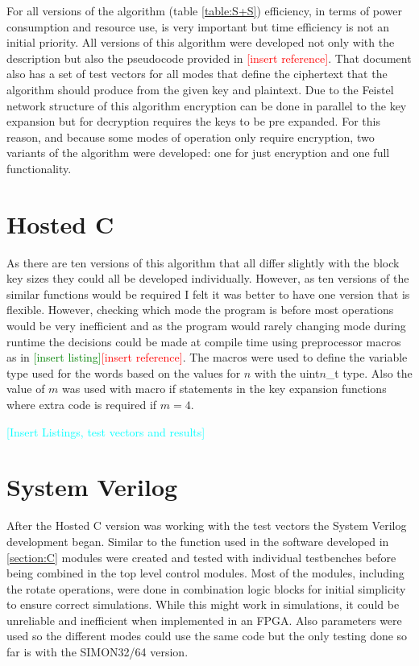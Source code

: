 \documentclass[12pt,twoside,a4paper]{report}
\begin{document}
    For all versions of the algorithm (table \ref{table:S+S}) efficiency, in terms of power consumption and resource use, is very important but time efficiency is not an initial priority. All versions of this algorithm were developed not only with the description but also the pseudocode provided in \textcolor{red}{[insert reference]}. That document also has a set of test vectors for all modes that define the ciphertext that the algorithm should produce from the given key and plaintext. Due to the Feistel network structure of this algorithm encryption can be done in parallel to the key expansion but for decryption requires the keys to be pre expanded. For this reason, and because some modes of operation only require encryption, two variants of the algorithm were developed: one for just encryption and one full functionality.
    
    \section{Hosted C}
    \label{section:C}
    As there are ten versions of this algorithm that all differ slightly with the block key sizes they could all be developed individually. However, as ten versions of the similar functions would be required I felt it was better to have one version that is flexible. However, checking which mode the program is before most operations would be very inefficient and as the program would rarely changing mode during runtime the decisions could be made at compile time using preprocessor macros as in \textcolor{green}{[insert listing]}\textcolor{red}{[insert reference]}. The macros were used to define the variable type used for the words based on the values for $n$ with the uint$n$\_t type. Also the value of $m$ was used with macro if statements in the key expansion functions where extra code is required if $m = 4$.
    
    \textcolor{cyan}{[Insert Listings, test vectors and results]}
    
    \section{System Verilog}
    After the Hosted C version was working with the test vectors the System Verilog development began. Similar to the function used in the software developed in \autoref{section:C} modules were created and tested with individual testbenches before being combined in the top level control modules. Most of the modules, including the rotate operations, were done in combination logic blocks for initial simplicity to ensure correct simulations. While this might work in simulations, it could be unreliable and inefficient when implemented in an FPGA. Also parameters were used so the different modes could use the same code but the only testing done so far is with the SIMON32/64 version.
    
\end{document}
